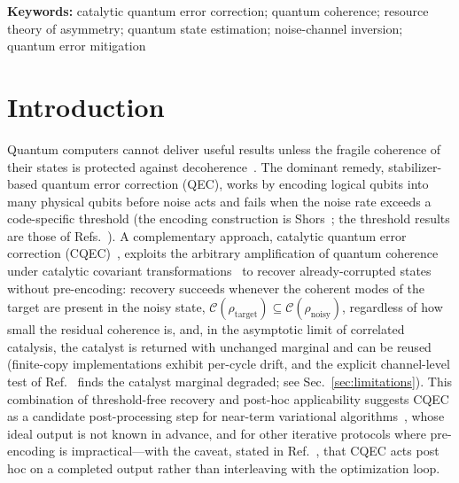\documentclass[12pt,a4paper]{article}
\newcommand{\CC}{\mathcal{C}}
\newcommand{\rhot}{\rho_\mathrm{target}}
\newcommand{\rhon}{\rho_\mathrm{noisy}}
\begin{document}
\noindent\textbf{Keywords:} catalytic quantum error correction; quantum coherence; resource theory of asymmetry; quantum state estimation; noise-channel inversion; quantum error mitigation


 
\section{Introduction}
\label{sec:introduction}

Quantum computers cannot deliver useful results unless the fragile coherence of their states is protected against decoherence~\cite{NielsenChuang2010}.
The dominant remedy, stabilizer-based quantum error correction (QEC), works by encoding logical qubits into many physical qubits before noise acts and fails when the noise rate exceeds a code-specific threshold (the encoding construction is Shor\textquotesingle s~\cite{Shor1995}; the threshold results are those of Refs.~\cite{Gottesman1997,Knill2005}).
A complementary approach, catalytic quantum error correction (CQEC)~\cite{Wakaura2026unified}, exploits the arbitrary amplification of quantum coherence under catalytic covariant transformations~\cite{Takagi2022correlation,Shiraishi2024} to recover already-corrupted states without pre-encoding: recovery succeeds whenever the coherent modes of the target are present in the noisy state, $\CC(\rhot) \subseteq \CC(\rhon)$, regardless of how small the residual coherence is, and, in the asymptotic limit of correlated catalysis, the catalyst is returned with unchanged marginal and can be reused~\cite{Shiraishi2024,Wakaura2026unified} (finite-copy implementations exhibit per-cycle drift, and the explicit channel-level test of Ref.~\cite{Wakaura2026unified} finds the catalyst marginal degraded; see Sec.~\ref{sec:limitations}).
This combination of threshold-free recovery and post-hoc applicability suggests CQEC as a candidate post-processing step for near-term variational algorithms~\cite{Peruzzo2014,Cerezo2021}, whose ideal output is not known in advance, and for other iterative protocols where pre-encoding is impractical---with the caveat, stated in Ref.~\cite{Wakaura2026unified}, that CQEC acts post hoc on a completed output rather than interleaving with the optimization loop.
\end{document}
